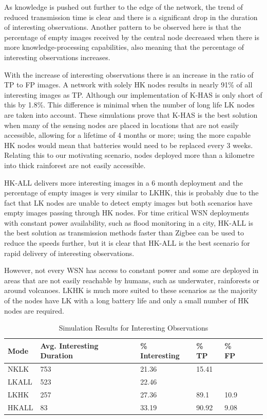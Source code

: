 	As knowledge is pushed out further to the edge of the network, the trend of reduced transmission time is clear and there is a significant drop in the duration of interesting observations. Another pattern to be observed here is that the percentage of empty images received by the central node decreased when there is more knowledge-processing capabilities, also meaning that the percentage of interesting observations increases.

	With the increase of interesting observations there is an increase in the ratio of TP to FP images. A network with solely HK nodes results in nearly 91\% of all interesting images as TP. Although our implementation of K-HAS is only short of this by 1.8\%. This difference is minimal when the number of long life LK nodes are taken into account. These simulations prove that K-HAS is the best solution when many of the sensing nodes are placed in locations that are not easily accessible, allowing for a lifetime of 4 months or more; using the more capable HK nodes would mean that batteries would need to be replaced every 3 weeks. Relating this to our motivating scenario, nodes deployed more than a kilometre into thick rainforest are not easily accessible. 

	HK-ALL delivers more interesting images in a 6 month deployment and the percentage of empty images is very similar to LKHK, this is probably due to the fact that LK nodes are unable to detect empty images but both scenarios have empty images passing through HK nodes. For time critical WSN deployments with constant power availability, such as flood monitoring in a city, HK-ALL is the best solution as transmission methods faster than Zigbee can be used to reduce the speeds further, but it is clear that HK-ALL is the best scenario for rapid delivery of interesting observations.
	
	However, not every WSN has access to constant power and some are deployed in areas that are not easily reachable by humans, such as underwater, rainforests or around volcanoes. LKHK is much more suited to these scenarios as the majority of the nodes have LK with a long battery life and only a small number of HK nodes are required.


\begin{table}[h]\footnotesize
\begin{tabularx}{\textwidth}{ |X|X|X|X|X|X|X| }
\hline
Mode & Avg. Interesting Duration & \% Interesting & \% TP & \% FP \\
\hline
NKLK & 753 & 21.36 & 15.41 & \\
LKALL & 523 & 22.46 & & \\
LKHK & 257 & 27.36 & 89.1 & 10.9 \\
HKALL & 83 & 33.19 & 90.92 & 9.08 \\
\hline
\end{tabularx}
\caption{Simulation Results for Interesting Observations}\label{tab:observ_int}
\end{table}

